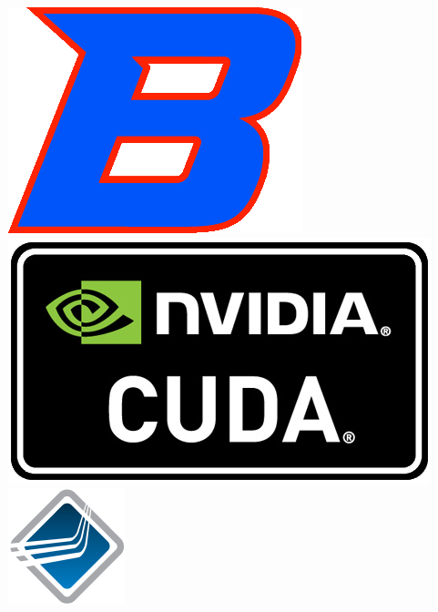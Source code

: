 \documentclass[17pt,hyperref={pdfpagelabels=false}]{beamer}
\newlength{\onecolumnwidth}
\begin{document}
\begin{frame}[t]
\begin{columns}[t,onlytextwidth=\textwidth]
\begin{column}{0.99\paperwidth}
\begin{columns}[t,onlytextwidth=\textwidth]
\begin{column}[t,onlytextwidth=\textwidth]{\onecolumnwidth}
            \includegraphics[scale=0.8]{bsulogo.png}\hspace{1cm}
            \includegraphics[scale=0.5]{nvidia-cuda2.png}\hspace{1cm}
            \includegraphics[scale=1.0]{open-mpi-logo.png}\hspace{1cm}

\end{column}
\end{columns}
\end{column}
\end{columns}
\end{frame}
\end{document}
